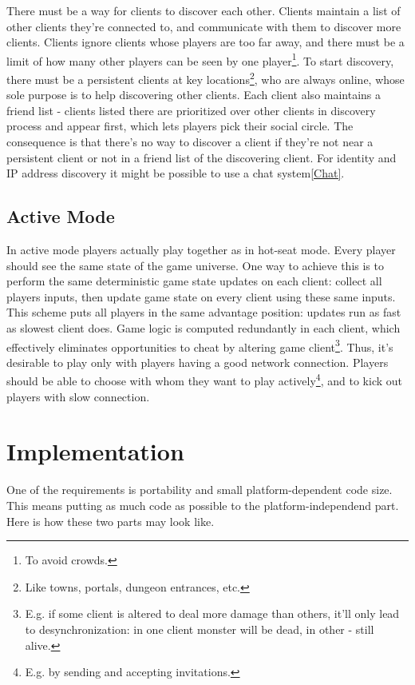 \documentclass[12pt]{article}
\begin{document}
There must be a way for clients to discover each other.
Clients maintain a list of other clients they're connected to,
and communicate with them to discover more clients.
Clients ignore clients whose players are too far away, and there must
be a limit of how many other players can be seen by one player\footnote{
    To avoid crowds.
}.
To start discovery, there must be a persistent clients at key
locations\footnote{
    Like towns, portals, dungeon entrances, etc.
}, who are always online, whose sole purpose is to help discovering other
clients.
Each client also maintains a friend list - clients listed there are
prioritized over other clients in discovery process and appear first,
which lets players pick their social circle.
The consequence is that there's no way to discover a client if
they're not near a persistent client or not in a friend list of the
discovering client.
For identity and IP address discovery it might be possible to use a chat
system\cref{Chat}.

\subsection{Active Mode}

In active mode players actually play together as in hot-seat mode.
Every player should see the same state of the game universe.
One way to achieve this is to perform the same deterministic game
state updates on each client: collect all players inputs, then
update game state on every client using these same inputs.
This scheme puts all players in the same advantage position:
updates run as fast as slowest client does.
Game logic is computed redundantly in each client, which effectively
eliminates opportunities to cheat by altering game client\footnote{
    E.g. if some client is altered to deal more damage than others,
    it'll only lead to desynchronization: in one client monster
    will be dead, in other - still alive.}.
Thus, it's desirable to play only with players having a good network connection.
Players should be able to choose with whom they want to play
actively\footnote{
    E.g. by sending and accepting invitations.
}, and to kick out players with slow connection.

\section{Implementation}

One of the requirements is portability and small platform-dependent code size.
This means putting as much code as possible to the platform-independend part.
Here is how these two parts may look like.
\end{document}
